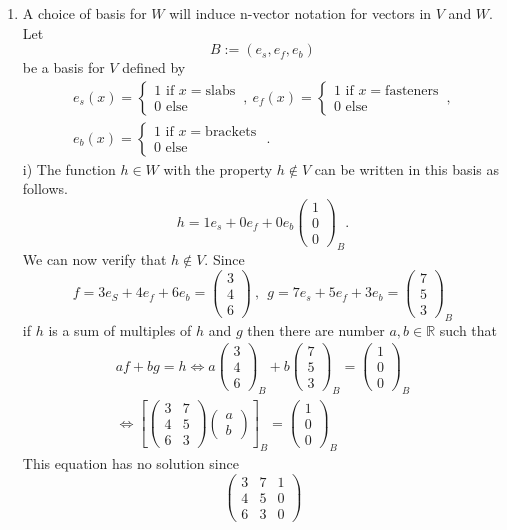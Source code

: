 \documentclass[12pt]{article}
\def\b{\beta}
\def\ba{\left(\begin{array}{cc}}
\def\bv{\left(\begin{array}{c}}
\def\ev{\end{array}\right) }
\def\LR{\Leftrightarrow}
\begin{document}
\begin{enumerate}
\begin{enumerate}
\item 
A choice of basis for $W$ will induce n-vector notation for vectors in $V$ and $W$.
Let 
\[B:=( e_s,e_f,e_b)\] 
be a basis for $V$ defined by 
\begin{gather*}
e_s(x)=\left\{ \begin{array}{l} 1 \text{~if~} x=\text{slabs}\\ 0 \text{~else~} \end{array} \right.\, , ~
e_f(x)=\left\{ \begin{array}{l} 1 \text{~if~} x=\text{fasteners}\\ 0 \text{~else~} \end{array} \right.\, , \\
e_b(x)=\left\{ \begin{array}{l} 1 \text{~if~} x=\text{brackets }\\ 0 \text{~else~} \end{array} \right. .
\end{gather*}
i) The function $h\in W$ with the property $h\notin V$ can be written in this basis as follows.
\[h=1e_s+0e_f+0e_b \bv 1\\0\\0 \ev_B.\]
We can now verify that $h\notin V$. Since
\[f=3e_S+4e_f+6e_b=\bv 3\\4\\6 \ev~,~~g=7e_s+5e_f+3e_b = \bv 7\\5\\3 \ev_B\]
if $h$ is  a sum of multiples of $h$ and $g$ then there are number $a,b\in \mathbb{R}$ such that
\begin{gather*}af+bg=h \LR a\bv 3\\4\\6 \ev_B+b \bv 7\\5\\3 \ev_B= \bv 1\\0\\0 \ev_B\\
\LR \left[\ba 3&7 \\4&5\\6&3 \ev \bv a\\b \ev\right]_B= \bv 1\\0\\0 \ev_B\end{gather*}
This equation has no solution since 
\[
\left( \begin{array}{cc|c}
3&7&1\\4&5&0\\6&3&0
\end{array}\right)
\]
\end{enumerate}
\end{enumerate}
\end{document}
